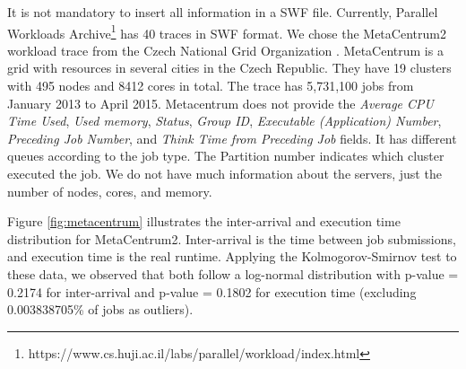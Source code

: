 It is not mandatory to insert all information in a SWF file. Currently, Parallel Workloads Archive\footnote{https://www.cs.huji.ac.il/labs/parallel/workload/index.html} has 40 traces in SWF format. We chose the MetaCentrum2 workload trace from the Czech National Grid Organization \cite{klusavcek2015real}. MetaCentrum is a grid with resources in several cities in the Czech Republic. They have 19 clusters with 495 nodes and 8412 cores in total. The trace has 5,731,100 jobs from January 2013 to April 2015. Metacentrum does not provide the \textit{Average CPU Time Used}, \textit{Used memory}, \textit{Status}, \textit{Group ID}, \textit{Executable (Application) Number}, \textit{Preceding Job Number}, and \textit{Think Time from Preceding Job} fields. It has different queues according to the job type. The Partition number indicates which cluster executed the job. We do not have much information about the servers, just the number of nodes, cores, and memory.

Figure \ref{fig:metacentrum} illustrates the inter-arrival and execution time distribution for MetaCentrum2. Inter-arrival is the time between job submissions, and execution time is the real runtime. Applying the Kolmogorov-Smirnov test to these data, we observed that both follow a log-normal distribution with p-value = 0.2174 for inter-arrival and p-value = 0.1802 for execution time (excluding 0.003838705\% of jobs as outliers).

